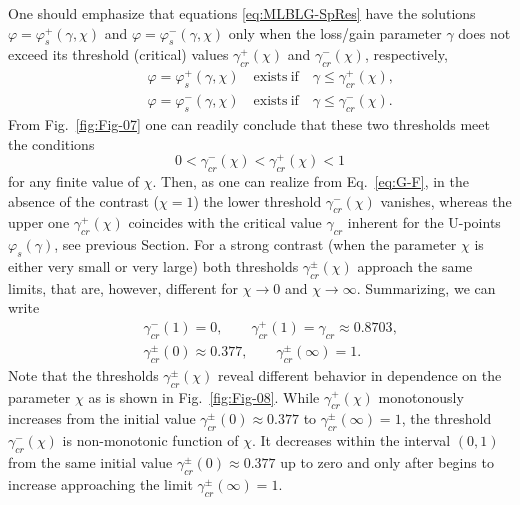 \documentclass[aps,pra,reprint,showpacs,bibnotes,preprintnumbers,twoside,eqsecnum]{revtex4-1}
\begin{document}
One should emphasize that equations \eqref{eq:MLBLG-SpRes} have the solutions $\varphi=\varphi_s^{+}(\gamma,\chi)$ and $\varphi=\varphi_s^{-}(\gamma,\chi)$ only when the loss/gain parameter $\gamma$ does not exceed its threshold (critical) values
$\gamma_{cr}^{+}(\chi)$ and $\gamma_{cr}^{-}(\chi)$, respectively,
%
\begin{subequations}\label{eq:MLBLG-gamma-thresh-def}
\begin{eqnarray}
&&\varphi=\varphi_s^{+}(\gamma,\chi)\quad\mathrm{exists\ if}\quad\gamma\leqslant\gamma_{cr}^{+}(\chi),\\
&&\varphi=\varphi_s^{-}(\gamma,\chi)\quad\mathrm{exists\ if}\quad\gamma\leqslant\gamma_{cr}^{-}(\chi).
\end{eqnarray}
\end{subequations}
From Fig.~\ref{fig:Fig-07} one can readily conclude that these two thresholds meet the conditions
%
\begin{equation}\label{eq:MLBLG-gamma-thresh-rel}
0<\gamma_{cr}^{-}(\chi)<\gamma_{cr}^{+}(\chi)<1
\end{equation}
for any finite value of $\chi$. Then, as one can realize from Eq.~\eqref{eq:G-F}, in the absence of the contrast ($\chi=1$) the lower threshold $\gamma_{cr}^{-}(\chi)$ vanishes, whereas the upper one $\gamma_{cr}^{+}(\chi)$ coincides with the critical value $\gamma_{cr}$ inherent for the U-points $\varphi_s(\gamma)$, see previous Section. For a strong contrast (when the parameter $\chi$ is either very small or very large) both thresholds $\gamma_{cr}^{\pm}(\chi)$ approach the same limits, that are, however, different for $\chi\to0$ and $\chi\to\infty$. Summarizing, we can write
%
\begin{subequations}\label{eq:MLBLG-gamma-thresh-lim}
\begin{eqnarray}
&&\gamma_{cr}^{-}(1)=0,\qquad\gamma_{cr}^{+}(1)=\gamma_{cr}\approx0.8703,\\
&&\gamma_{cr}^{\pm}(0)\approx0.377,\qquad\gamma_{cr}^{\pm}(\infty)=1.
\end{eqnarray}
\end{subequations}
Note that the thresholds $\gamma_{cr}^{\pm}(\chi)$ reveal different behavior in dependence on the parameter $\chi$ as is shown in Fig.~\ref{fig:Fig-08}. While $\gamma_{cr}^{+}(\chi)$ monotonously increases from the initial value $\gamma_{cr}^{\pm}(0)\approx0.377$ to $\gamma_{cr}^{\pm}(\infty)=1$, the threshold $\gamma_{cr}^{-}(\chi)$ is non-monotonic function of $\chi$. It decreases within the interval $(0,1)$ from the same initial value $\gamma_{cr}^{\pm}(0)\approx0.377$ up to zero and only after begins to increase approaching the limit $\gamma_{cr}^{\pm}(\infty)=1$.
\end{document}
